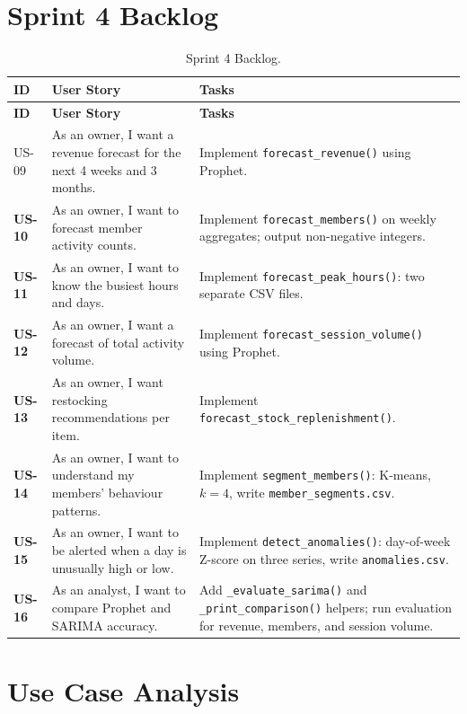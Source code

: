 \documentclass[12pt, a4paper]{report}
\begin{document}
\section{Sprint 4 Backlog}

\begin{longtable}{>{\bfseries}p{1.3cm} p{4.0cm} p{7.2cm}}
  \caption{Sprint 4 Backlog.\label{tab:sprint4_backlog}} \\
  \toprule
  \textbf{ID} & \textbf{User Story} & \textbf{Tasks} \\
  \midrule
  \endfirsthead
  \toprule
  \textbf{ID} & \textbf{User Story} & \textbf{Tasks} \\
  \midrule
  \endhead
  \bottomrule
  \endfoot

  US-09 & As an owner, I want a revenue forecast for the next 4 weeks and 3 months.
        & Implement \texttt{forecast\_revenue()} using Prophet. \\[4pt]
  US-10 & As an owner, I want to forecast member activity counts.
        & Implement \texttt{forecast\_members()} on weekly aggregates;
          output non-negative integers. \\[4pt]
  US-11 & As an owner, I want to know the busiest hours and days.
        & Implement \texttt{forecast\_peak\_hours()}: two separate CSV files. \\[4pt]
  US-12 & As an owner, I want a forecast of total activity volume.
        & Implement \texttt{forecast\_session\_volume()} using Prophet. \\[4pt]
  US-13 & As an owner, I want restocking recommendations per item.
        & Implement \texttt{forecast\_stock\_replenishment()}. \\[4pt]
  US-14 & As an owner, I want to understand my members' behaviour patterns.
        & Implement \texttt{segment\_members()}: K-means, $k=4$,
          write \texttt{member\_segments.csv}. \\[4pt]
  US-15 & As an owner, I want to be alerted when a day is unusually high or low.
        & Implement \texttt{detect\_anomalies()}: day-of-week Z-score on three
          series, write \texttt{anomalies.csv}. \\[4pt]
  US-16 & As an analyst, I want to compare Prophet and SARIMA accuracy.
        & Add \texttt{\_evaluate\_sarima()} and \texttt{\_print\_comparison()}
          helpers; run evaluation for revenue, members, and session volume. \\
\end{longtable}

\section{Use Case Analysis}
\end{document}

